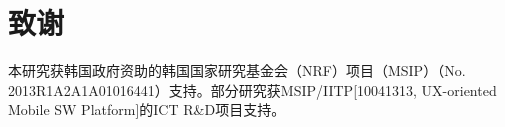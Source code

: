 \section*{致谢}

本研究获韩国政府资助的韩国国家研究基金会（NRF）项目（MSIP）（No. 2013R1A2A1A01016441）支持。部分研究获MSIP/IITP[10041313, UX-oriented Mobile SW Platform]的ICT R\&D项目支持。